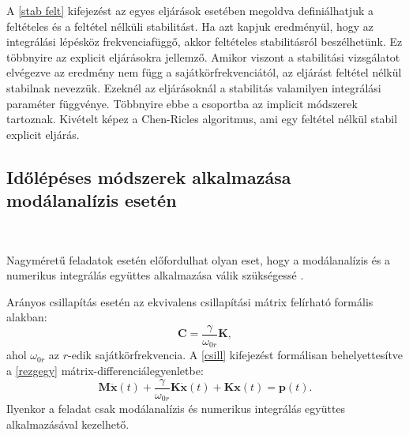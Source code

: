 A \eqref{stab felt} kifejezést az egyes eljárások esetében megoldva definiálhatjuk a feltételes és a feltétel nélküli stabilitást. Ha azt kapjuk eredményül, hogy az integrálási lépésköz frekvenciafüggő, akkor feltételes stabilitásról beszélhetünk. Ez többnyire az explicit eljárásokra jellemző. Amikor viszont a stabilitási vizsgálatot elvégezve az eredmény nem függ a sajátkörfrekvenciától, az eljárást feltétel nélkül stabilnak nevezzük. Ezeknél az eljárásoknál a stabilitás valamilyen integrálási paraméter függvénye. Többnyire ebbe a csoportba  az implicit módszerek tartoznak. Kivételt képez a Chen-Ricles algoritmus, ami egy feltétel nélkül stabil explicit eljárás.  


\subsection{Időlépéses módszerek alkalmazása modálanalízis esetén}

{\ }

Nagyméretű feladatok esetén előfordulhat olyan eset, hogy a modálanalízis és a numerikus integrálás együttes alkalmazása válik szükségessé \cite{gyorgyi}. 

Arányos csillapítás esetén az ekvivalens csillapítási mátrix felírható formális alakban:
\begin{equation}
\label{csill}
\mathbf{C} = \frac{\gamma}{\omega_{0r}}\mathbf{K},
\end{equation}
ahol $\omega_{0r}$ az $r$-edik sajátkörfrekvencia. A \eqref{csill} kifejezést formálisan behelyettesítve a \eqref{rezgegy} mátrix-differenciálegyenletbe:
\begin{equation*}
\mathbf{M}\mathbf{\ddot{x}}(t)+\frac{\gamma}{\omega_{0r}}\mathbf{K}\mathbf{\dot{x}}(t)+\mathbf{K}\mathbf{x}(t) = \mathbf{p}(t).
\end{equation*}
Ilyenkor a feladat csak modálanalízis és numerikus integrálás együttes alkalmazásával kezelhető.

